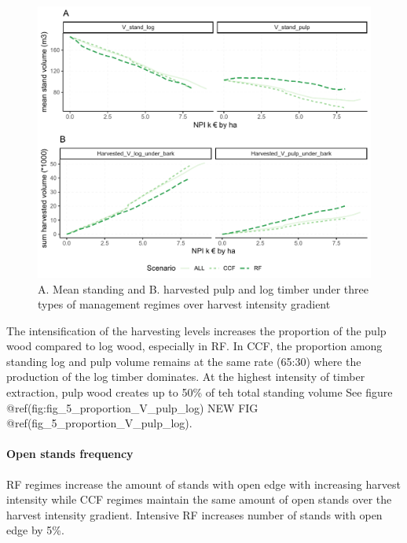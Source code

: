 \documentclass[]{elsarticle} %
\makeatletter
\def\maxwidth{\ifdim\Gin@nat@width>\linewidth\linewidth
\else\Gin@nat@width\fi}
\let\Oldincludegraphics\includegraphics
\renewcommand{\includegraphics}[1]{\Oldincludegraphics[width=\maxwidth]{#1}}
\makeatother
\begin{document}
\begin{figure}
\centering
\includegraphics{test_manus_files/figure-latex/fig_4_plot_V_timber-1.pdf}
\caption{A. Mean standing and B. harvested pulp and log timber under
three types of management regimes over harvest intensity gradient}
\end{figure}

The intensification of the harvesting levels increases the proportion of
the pulp wood compared to log wood, especially in RF. In CCF, the
proportion among standing log and pulp volume remains at the same rate
(65:30) where the production of the log timber dominates. At the highest
intensity of timber extraction, pulp wood creates up to 50\% of teh
total standing volume See figure
@ref(fig:fig\_5\_proportion\_V\_pulp\_log) NEW FIG
@ref(fig\_5\_proportion\_V\_pulp\_log).

\paragraph{Open stands frequency}\label{open-stands-frequency}

RF regimes increase the amount of stands with open edge with increasing
harvest intensity while CCF regimes maintain the same amount of open
stands over the harvest intensity gradient. Intensive RF increases
number of stands with open edge by 5\%.
\end{document}
